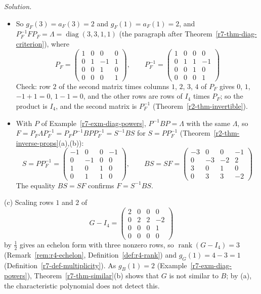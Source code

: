 \documentclass[12pt]{article}
\DeclareMathOperator{\diag}{diag}
\DeclareMathOperator{\rank}{rank}
\theoremstyle{definition}
\newenvironment{solution}{\par\noindent\textit{Solution.}\ }{\par\smallskip}
\begin{document}
\begin{solution}
\begin{itemize}
\[\xrightarrow[R_2\leftarrow\frac12R_2]{R_1\leftarrow\frac12R_1}
\begin{pmatrix}1&0&0&0\\0&1&1&-1\\0&0&0&0\\0&0&0&0\end{pmatrix}
\]
The free unknowns are \(x_3\), \(x_4\); the special solutions \((0,-1,1,0)'\) and \((0,1,0,1)'\) form a basis of
\(\mathcal N(F-I_4)\).
\item So \(g_F(3)=a_F(3)=2\) and \(g_F(1)=a_F(1)=2\), and \(P_F^{-1}FP_F=\Lambda=\diag(3,3,1,1)\) (the paragraph after
Theorem~\ref{r7-thm-diag-criterion}), where
\[
P_F=\begin{pmatrix}1&0&0&0\\0&1&-1&1\\0&0&1&0\\0&0&0&1\end{pmatrix},\qquad
P_F^{-1}=\begin{pmatrix}1&0&0&0\\0&1&1&-1\\0&0&1&0\\0&0&0&1\end{pmatrix}
\]
Check: row \(2\) of the second matrix times columns \(1\), \(2\), \(3\), \(4\) of \(P_F\) gives \(0\), \(1\), \(-1+1=0\),
\(1-1=0\), and the other rows are rows of \(I_4\) times \(P_F\); so the product is \(I_4\), and the second matrix is
\(P_F^{-1}\) (Theorem~\ref{r2-thm-invertible}).
\item With \(P\) of Example~\ref{r7-exm-diag-powers}, \(P^{-1}BP=\Lambda\) with the same \(\Lambda\), so
\(F=P_F\Lambda P_F^{-1}=P_FP^{-1}BPP_F^{-1}=S^{-1}BS\) for \(S=PP_F^{-1}\) (Theorem~\ref{r2-thm-inverse-props}(a),(b)):
\[
S=PP_F^{-1}=\begin{pmatrix}-1&0&0&-1\\0&-1&0&0\\1&0&1&0\\0&1&1&0\end{pmatrix},\qquad
BS=SF=\begin{pmatrix}-3&0&0&-1\\0&-3&-2&2\\3&0&1&0\\0&3&3&-2\end{pmatrix}
\]
The equality \(BS=SF\) confirms \(F=S^{-1}BS\).
\end{itemize}
(c) Scaling rows \(1\) and \(2\) of
\[
G-I_4=\begin{pmatrix}2&0&0&0\\0&2&2&-2\\0&0&0&1\\0&0&0&0\end{pmatrix}
\]
by \(\frac12\) gives an echelon form with three nonzero rows, so \(\rank(G-I_4)=3\) (Remark~\ref{rem:r4-echelon},
Definition~\ref{def:r4-rank}) and \(g_G(1)=4-3=1\) (Definition~\ref{r7-def-multiplicity}). As \(g_B(1)=2\)
(Example~\ref{r7-exm-diag-powers}), Theorem~\ref{r7-thm-similar}(b) shows that \(G\) is not similar to \(B\); by (a), the
characteristic polynomial does not detect this.
\end{solution}
\end{document}
